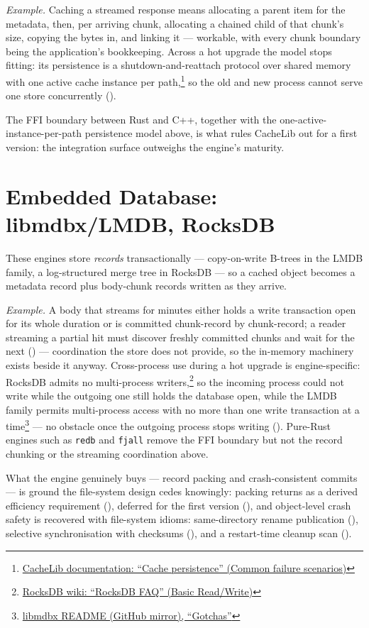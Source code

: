 \emph{Example.} Caching a streamed response means allocating a parent
item for the metadata, then, per arriving chunk, allocating a chained
child of that chunk's size, copying the bytes in, and linking it ---
workable, with every chunk boundary being the application's bookkeeping.
Across a hot upgrade the model stops fitting: its persistence is a
shutdown-and-reattach protocol over shared memory with one active cache
instance per
path,\footnote{\href{https://cachelib.org/docs/Cache_Library_User_Guides/Cache_persistence/\#common-failure-scenarios}{CacheLib documentation: ``Cache persistence'' (Common failure scenarios)}}
so the old and new process cannot serve one store concurrently
().

The FFI boundary between Rust and C++, together with the
one-active-instance-per-path persistence model above, is what rules
CacheLib out for a first version: the integration surface outweighs
the engine's maturity.

\section{Embedded Database: libmdbx/LMDB, RocksDB}
\label{app:alt-embdb}

These engines store \emph{records} transactionally --- copy-on-write
B-trees in the LMDB family, a log-structured merge tree in RocksDB ---
so a cached object becomes a metadata record plus body-chunk records
written as they arrive.

\emph{Example.} A body that streams for minutes either holds a write
transaction open for its whole duration or is committed
chunk-record by chunk-record; a reader streaming a partial hit must
discover freshly committed chunks and wait for the next
() --- coordination the store does
not provide, so the in-memory machinery exists beside it anyway.
Cross-process use during a hot upgrade is engine-specific: RocksDB
admits no multi-process
writers,\footnote{\href{https://github.com/facebook/rocksdb/wiki/RocksDB-FAQ\#basic-readwrite}{RocksDB wiki: ``RocksDB FAQ'' (Basic Read/Write)}}
so the incoming process could not write while the outgoing one still holds
the database open, while the LMDB family permits multi-process access with
no more than one write transaction at a
time\footnote{\href{https://github.com/erthink/libmdbx\#gotchas}{libmdbx README (GitHub mirror), ``Gotchas''}}
--- no obstacle once the outgoing process stops writing
(). Pure-Rust engines such as \texttt{redb} and
\texttt{fjall} remove the FFI boundary but not the record chunking or the
streaming coordination above.

What the engine genuinely buys --- record packing and crash-consistent
commits --- is ground the file-system design cedes knowingly: packing
returns as a derived efficiency requirement
(), deferred for the first version
(), and object-level crash safety is
recovered with file-system idioms: same-directory rename publication
(), selective synchronisation with
checksums (), and a restart-time
cleanup scan ().
